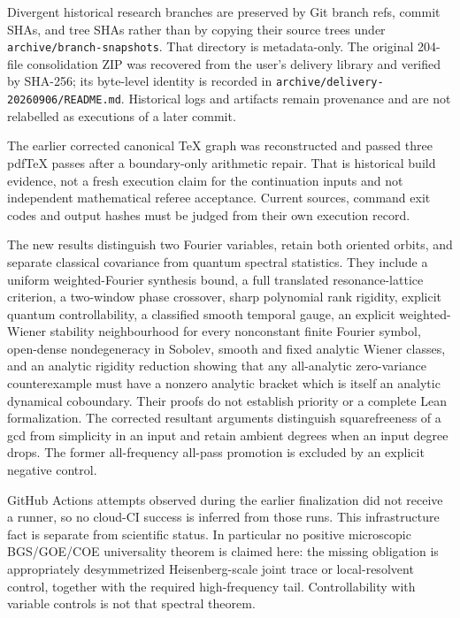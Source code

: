 Divergent historical research branches are preserved by Git branch refs,
commit SHAs, and tree SHAs rather than by copying their source trees under
\texttt{archive/branch-snapshots}. That directory is metadata-only. The
original 204-file consolidation ZIP was recovered from the user's delivery
library and verified by SHA-256; its byte-level identity is recorded in
\texttt{archive/delivery-20260906/README.md}. Historical logs and artifacts
remain provenance and are not relabelled as executions of a later commit.

The earlier corrected canonical TeX graph was reconstructed and passed three
pdfTeX passes after a boundary-only arithmetic repair. That is historical
build evidence, not a fresh execution claim for the continuation inputs and
not independent mathematical referee acceptance. Current sources, command
exit codes and output hashes must be judged from their own execution record.

The new results distinguish two Fourier variables, retain both oriented
orbits, and separate classical covariance from quantum spectral statistics.
They include a uniform weighted-Fourier synthesis bound, a full translated
resonance-lattice criterion, a two-window phase crossover, sharp polynomial
rank rigidity, explicit quantum controllability, a classified smooth
temporal gauge, an explicit weighted-Wiener stability neighbourhood for every
nonconstant finite Fourier symbol, open-dense nondegeneracy in Sobolev,
smooth and fixed analytic Wiener classes, and an analytic rigidity reduction
showing that any all-analytic zero-variance counterexample must have a nonzero
analytic bracket which is itself an analytic dynamical coboundary. Their
proofs do not establish priority or a complete Lean formalization. The
corrected resultant arguments distinguish squarefreeness of a gcd from
simplicity in an input and retain ambient degrees when an input degree drops.
The former all-frequency all-pass promotion is excluded by an explicit
negative control.

GitHub Actions attempts observed during the earlier finalization did not
receive a runner, so no cloud-CI success is inferred from those runs. This
infrastructure fact is separate from scientific status. In particular no
positive microscopic BGS/GOE/COE universality theorem is claimed here: the
missing obligation is appropriately desymmetrized Heisenberg-scale joint
trace or local-resolvent control, together with the required high-frequency
tail. Controllability with variable controls is not that spectral theorem.
